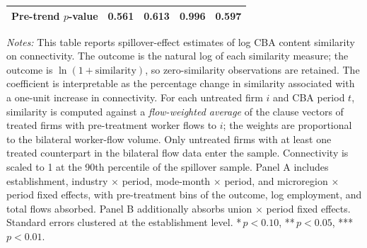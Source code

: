 \begin{table}[H]
\begin{tabular}{lcccc}
Pre-trend $p$-value & 0.561 & 0.613 & 0.996 & 0.597 \\
\hline\hline
\end{tabular}
\begin{minipage}{\linewidth}
\smallskip
\scriptsize\textit{Notes:} This table reports spillover-effect estimates of log CBA content similarity on connectivity. The outcome is the natural log of each similarity measure; the outcome is $\ln(1+\text{similarity})$, so zero-similarity observations are retained. The coefficient is interpretable as the percentage change in similarity associated with a one-unit increase in connectivity. For each untreated firm $i$ and CBA period $t$, similarity is computed against a \emph{flow-weighted average} of the clause vectors of treated firms with pre-treatment worker flows to $i$; the weights are proportional to the bilateral worker-flow volume. Only untreated firms with at least one treated counterpart in the bilateral flow data enter the sample. Connectivity is scaled to 1 at the 90th percentile of the spillover sample. Panel A includes establishment, industry $\times$ period, mode-month $\times$ period, and microregion $\times$ period fixed effects, with pre-treatment bins of the outcome, log employment, and total flows absorbed. Panel B additionally absorbs union $\times$ period fixed effects. Standard errors clustered at the establishment level. *\,$p<0.10$, **\,$p<0.05$, ***\,$p<0.01$.
\end{minipage}
\end{table}
